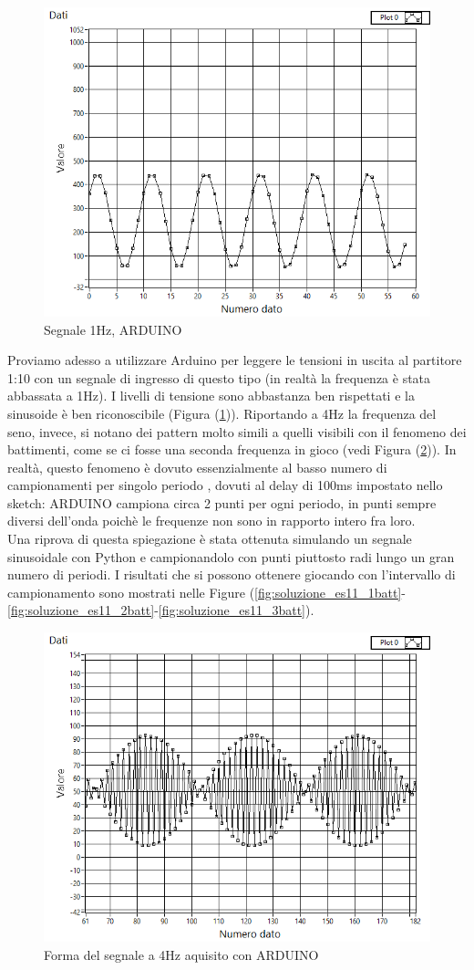\documentclass[journal, a4paper]{IEEEtran}
\begin{document}
\begin{figure}
\centering
\includegraphics[width=0.7\linewidth]{./es11_1hz_100ms}
\caption{Segnale 1Hz, ARDUINO}
\label{fig:es11_1hz_100ms}
\end{figure}

Proviamo adesso a utilizzare Arduino per leggere le tensioni in uscita al partitore 1:10 con un segnale di ingresso di questo tipo (in realtà la frequenza è stata abbassata a 1Hz). I livelli di tensione sono abbastanza ben rispettati e la sinusoide è ben riconoscibile (Figura (\ref{fig:es11_1hz_100ms})). Riportando a 4Hz la frequenza del seno, invece, si notano dei pattern molto simili a quelli visibili con il fenomeno dei battimenti, come se ci fosse una seconda frequenza in gioco (vedi Figura (\ref{fig:es11_4hz_100ms})). In realtà, questo fenomeno è dovuto essenzialmente al basso numero di campionamenti per singolo periodo , dovuti al delay di 100ms impostato nello sketch: ARDUINO campiona circa 2 punti per ogni periodo, in punti sempre diversi dell'onda poichè le frequenze non sono in rapporto intero fra loro. \\
Una riprova di questa spiegazione è stata ottenuta simulando un segnale sinusoidale con Python e campionandolo con punti piuttosto radi lungo un gran numero di periodi. I risultati che si possono ottenere giocando con l'intervallo di campionamento sono mostrati nelle Figure (\ref{fig:soluzione_es11_1batt}-\ref{fig:soluzione_es11_2batt}-\ref{fig:soluzione_es11_3batt}).\\


\begin{figure}
\centering
\includegraphics[width=0.7\linewidth]{./es11_4hz_100ms}
\caption{Forma del segnale a 4Hz aquisito con ARDUINO}
\label{fig:es11_4hz_100ms}
\end{figure}
\end{document}
